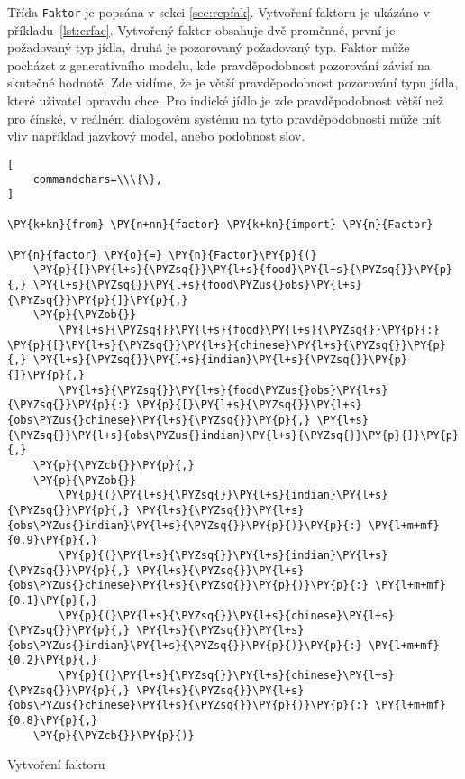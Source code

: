 Třída \texttt{Faktor} je popsána v sekci \ref{sec:repfak}.
Vytvoření faktoru je ukázáno v příkladu~\ref{lst:crfac}.
Vytvořený faktor obsahuje dvě proměnné, první je požadovaný typ jídla, druhá je pozorovaný požadovaný typ.
Faktor může pocházet z generativního modelu, kde pravděpodobnost pozorování závisí na skutečné hodnotě.
Zde vidíme, že je větší pravděpodobnost pozorování typu jídla, které uživatel opravdu chce.
Pro indické jídlo je zde pravděpodobnost větší než pro čínské, v reálném dialogovém systému na tyto pravděpodobnosti může mít vliv například jazykový model, anebo podobnost slov.

\begin{example}
\begin{Verbatim}[
    commandchars=\\\{\},
]

\PY{k+kn}{from} \PY{n+nn}{factor} \PY{k+kn}{import} \PY{n}{Factor}

\PY{n}{factor} \PY{o}{=} \PY{n}{Factor}\PY{p}{(}
    \PY{p}{[}\PY{l+s}{\PYZsq{}}\PY{l+s}{food}\PY{l+s}{\PYZsq{}}\PY{p}{,} \PY{l+s}{\PYZsq{}}\PY{l+s}{food\PYZus{}obs}\PY{l+s}{\PYZsq{}}\PY{p}{]}\PY{p}{,}
    \PY{p}{\PYZob{}}
        \PY{l+s}{\PYZsq{}}\PY{l+s}{food}\PY{l+s}{\PYZsq{}}\PY{p}{:} \PY{p}{[}\PY{l+s}{\PYZsq{}}\PY{l+s}{chinese}\PY{l+s}{\PYZsq{}}\PY{p}{,} \PY{l+s}{\PYZsq{}}\PY{l+s}{indian}\PY{l+s}{\PYZsq{}}\PY{p}{]}\PY{p}{,}
        \PY{l+s}{\PYZsq{}}\PY{l+s}{food\PYZus{}obs}\PY{l+s}{\PYZsq{}}\PY{p}{:} \PY{p}{[}\PY{l+s}{\PYZsq{}}\PY{l+s}{obs\PYZus{}chinese}\PY{l+s}{\PYZsq{}}\PY{p}{,} \PY{l+s}{\PYZsq{}}\PY{l+s}{obs\PYZus{}indian}\PY{l+s}{\PYZsq{}}\PY{p}{]}\PY{p}{,}
    \PY{p}{\PYZcb{}}\PY{p}{,}
    \PY{p}{\PYZob{}}
		\PY{p}{(}\PY{l+s}{\PYZsq{}}\PY{l+s}{indian}\PY{l+s}{\PYZsq{}}\PY{p}{,} \PY{l+s}{\PYZsq{}}\PY{l+s}{obs\PYZus{}indian}\PY{l+s}{\PYZsq{}}\PY{p}{)}\PY{p}{:} \PY{l+m+mf}{0.9}\PY{p}{,}
		\PY{p}{(}\PY{l+s}{\PYZsq{}}\PY{l+s}{indian}\PY{l+s}{\PYZsq{}}\PY{p}{,} \PY{l+s}{\PYZsq{}}\PY{l+s}{obs\PYZus{}chinese}\PY{l+s}{\PYZsq{}}\PY{p}{)}\PY{p}{:} \PY{l+m+mf}{0.1}\PY{p}{,}
		\PY{p}{(}\PY{l+s}{\PYZsq{}}\PY{l+s}{chinese}\PY{l+s}{\PYZsq{}}\PY{p}{,} \PY{l+s}{\PYZsq{}}\PY{l+s}{obs\PYZus{}indian}\PY{l+s}{\PYZsq{}}\PY{p}{)}\PY{p}{:} \PY{l+m+mf}{0.2}\PY{p}{,}
		\PY{p}{(}\PY{l+s}{\PYZsq{}}\PY{l+s}{chinese}\PY{l+s}{\PYZsq{}}\PY{p}{,} \PY{l+s}{\PYZsq{}}\PY{l+s}{obs\PYZus{}chinese}\PY{l+s}{\PYZsq{}}\PY{p}{)}\PY{p}{:} \PY{l+m+mf}{0.8}\PY{p}{,}
    \PY{p}{\PYZcb{}}\PY{p}{)}
\end{Verbatim}
\caption{Vytvoření faktoru}
\label{lst:crfac}
\end{example}

